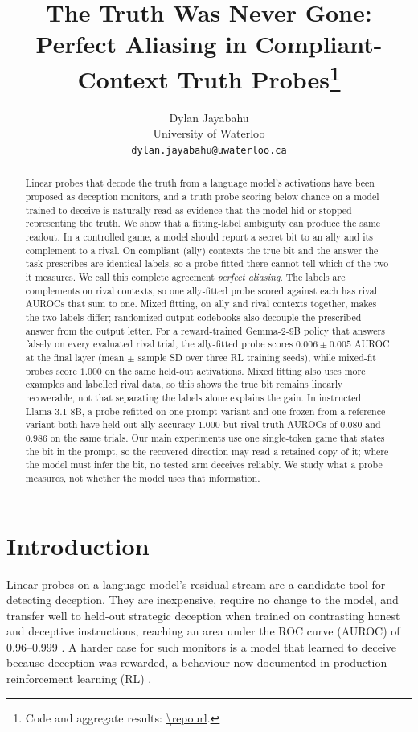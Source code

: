 \documentclass{article}
\title{The Truth Was Never Gone:\\ Perfect Aliasing in Compliant-Context Truth Probes\thanks{Code and aggregate results: \expandafter\url\expandafter{\repourl}.}}
\author{Dylan Jayabahu\\
  University of Waterloo\\
  \texttt{dylan.jayabahu@uwaterloo.ca}}
\date{}
\begin{document}
\maketitle
\setcounter{footnote}{0}

\begin{abstract}
Linear probes that decode the truth from a language model's activations have been proposed as deception monitors, and a truth probe scoring below chance on a model trained to deceive is naturally read as evidence that the model hid or stopped representing the truth. We show that a fitting-label ambiguity can produce the same readout. In a controlled game, a model should report a secret bit to an ally and its complement to a rival. On compliant (ally) contexts the true bit and the answer the task prescribes are identical labels, so a probe fitted there cannot tell which of the two it measures. We call this complete agreement \emph{perfect aliasing}. The labels are complements on rival contexts, so one ally-fitted probe scored against each has rival AUROCs that sum to one. Mixed fitting, on ally and rival contexts together, makes the two labels differ; randomized output codebooks also decouple the prescribed answer from the output letter. For a reward-trained Gemma-2-9B policy that answers falsely on every evaluated rival trial, the ally-fitted probe scores $0.006 \pm 0.005$ AUROC at the final layer (mean $\pm$ sample SD over three RL training seeds), while mixed-fit probes score $1.000$ on the same held-out activations. Mixed fitting also uses more examples and labelled rival data, so this shows the true bit remains linearly recoverable, not that separating the labels alone explains the gain. In instructed Llama-3.1-8B, a probe refitted on one prompt variant and one frozen from a reference variant both have held-out ally accuracy $1.000$ but rival truth AUROCs of $0.080$ and $0.986$ on the same trials. Our main experiments use one single-token game that states the bit in the prompt, so the recovered direction may read a retained copy of it; where the model must infer the bit, no tested arm deceives reliably. We study what a probe measures, not whether the model uses that information.
\end{abstract}

\section{Introduction}
\label{sec:intro}

Linear probes on a language model's residual stream are a candidate tool for detecting deception. They are inexpensive, require no change to the model, and transfer well to held-out strategic deception when trained on contrasting honest and deceptive instructions, reaching an area under the ROC curve (AUROC) of 0.96--0.999 \citep{goldowskydill2025}. A harder case for such monitors is a model that learned to deceive because deception was rewarded, a behaviour now documented in production reinforcement learning (RL) \citep{emergentmisalignment2025}.
\end{document}
